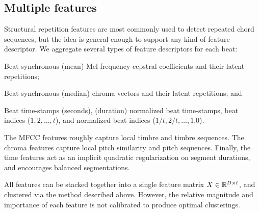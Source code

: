 \documentclass{article}
\begin{document}
\subsection{Multiple features}
Structural repetition features are most commonly used to detect repeated chord sequences, but the idea is general enough to
support any kind of feature descriptor.  We aggregate several types of feature descriptors for each beat:
\begin{description}\addtolength{\itemsep}{-0.5\baselineskip}%
\item[MFCC]   Beat-synchronous (mean) Mel-frequency cepstral coefficients and their latent repetitions;
\item[Chroma] Beat-synchronous (median) chroma vectors and their latent repetitions; and
\item[Time]   Beat time-stamps (seconds), (duration) normalized beat time-stamps, beat indices ($1, 2, \ldots, t$), 
and normalized beat indices ($1/t, 2/t, \ldots, 1.0$).
\end{description}
The MFCC features roughly capture local timbre and timbre sequences. The chroma features capture local pitch similarity and pitch
sequences. Finally, the time features act as an implicit quadratic regularization on segment durations, and encourages
balanced segmentations.

All features can be stacked together into a single feature matrix $X \in \mathbb{R}^{D\times t}$, and clustered via the method described
above. However, the relative magnitude and importance of each feature is not calibrated to produce optimal clusterings. 
\end{document}
